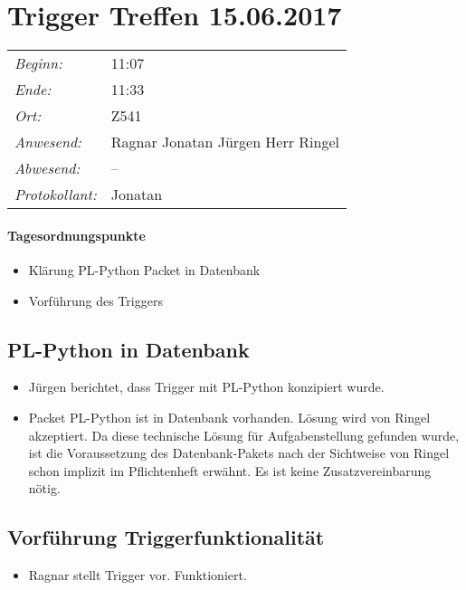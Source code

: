 \documentclass{scrartcl}
\date{15.06.2017}	%
\begin{document}
\maketitle
\section{Trigger Treffen 15.06.2017}	%
\begin{tabular}[t]{p{.25\linewidth} p{.25\linewidth}}
\emph{Beginn:}				& 11:07\\
\emph{Ende:}					& 11:33\\
\emph{Ort:}						& Z541\\
\emph{Anwesend:}	& 
Ragnar\newline
Jonatan\newline
Jürgen\newline
Herr Ringel
\\
\emph{Abwesend:}		 & 
--
\\
\emph{Protokollant:}& Jonatan
\end{tabular}
\paragraph{Tagesordnungspunkte}
\begin{itemize}
\item Klärung PL-Python Packet in Datenbank
\item Vorführung des Triggers
\end{itemize}

\subsection{PL-Python in Datenbank}
\begin{itemize}
\item Jürgen berichtet, dass Trigger mit PL-Python konzipiert wurde.
\item Packet PL-Python ist in Datenbank vorhanden. Lösung wird von Ringel akzeptiert. Da diese technische Lösung für Aufgabenstellung gefunden wurde, ist die Voraussetzung des Datenbank-Pakets nach der Sichtweise von Ringel schon implizit im Pflichtenheft erwähnt. Es ist keine Zusatzvereinbarung nötig.
\end{itemize}

\subsection{Vorführung Triggerfunktionalität}
\begin{itemize}
\item Ragnar stellt Trigger vor. Funktioniert.
\end{itemize}
\end{document}
